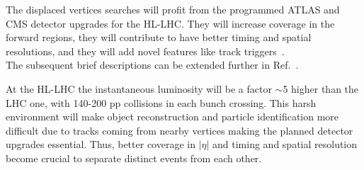 The displaced vertices
searches will profit from the programmed ATLAS and CMS detector
upgrades for the HL-LHC. 
They will increase coverage in the forward regions, they
will contribute to have better timing and spatial resolutions, and
they will add novel features like track
triggers~\cite{Alimena_2020}.\\
The subsequent brief descriptions can be extended further
in
Ref.~\cite{CERN-LHCC-2017-009,CERN-LHCC-2017-011,CERN-LHCC-2017-012,CERN-LHCC-2017-027,CERN-LHCC-2017-013}.

At the HL-LHC the
instantaneous luminosity will be a factor $\sim$5 higher than the LHC
one, with 140-200 pp collisions in each bunch crossing. This harsh
environment will make object reconstruction and particle
identification more difficult due to tracks coming from nearby
vertices making the planned detector upgrades essential. Thus, better coverage in $|\eta|$ and timing and spatial
resolution become crucial to
separate distinct events from each other. 


